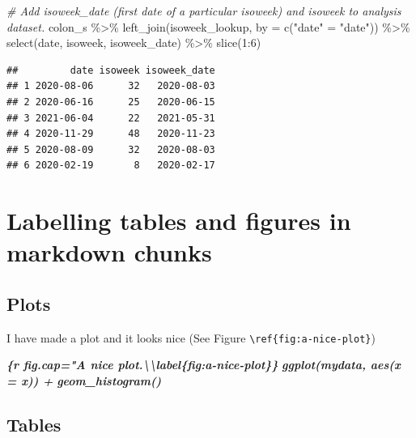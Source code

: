 \documentclass[
]{book}
\newenvironment{Shaded}{\begin{snugshade}}{\end{snugshade}}
\newcommand{\AttributeTok}[1]{\textcolor[rgb]{0.77,0.63,0.00}{#1}}
\newcommand{\CommentTok}[1]{\textcolor[rgb]{0.56,0.35,0.01}{\textit{#1}}}
\newcommand{\DecValTok}[1]{\textcolor[rgb]{0.00,0.00,0.81}{#1}}
\newcommand{\FunctionTok}[1]{\textcolor[rgb]{0.00,0.00,0.00}{#1}}
\newcommand{\InformationTok}[1]{\textcolor[rgb]{0.56,0.35,0.01}{\textbf{\textit{#1}}}}
\newcommand{\NormalTok}[1]{#1}
\newcommand{\OtherTok}[1]{\textcolor[rgb]{0.56,0.35,0.01}{#1}}
\newcommand{\SpecialCharTok}[1]{\textcolor[rgb]{0.00,0.00,0.00}{#1}}
\newcommand{\StringTok}[1]{\textcolor[rgb]{0.31,0.60,0.02}{#1}}
\begin{document}
\begin{Shaded}
\begin{Highlighting}[]
\CommentTok{\# Add isoweek\_date (first date of a particular isoweek) and isoweek to analysis dataset. }
\NormalTok{colon\_s }\SpecialCharTok{\%\textgreater{}\%} 
  \FunctionTok{left\_join}\NormalTok{(isoweek\_lookup, }\AttributeTok{by =} \FunctionTok{c}\NormalTok{(}\StringTok{"date"} \OtherTok{=} \StringTok{"date"}\NormalTok{)) }\SpecialCharTok{\%\textgreater{}\%} 
  \FunctionTok{select}\NormalTok{(date, isoweek, isoweek\_date) }\SpecialCharTok{\%\textgreater{}\%} 
  \FunctionTok{slice}\NormalTok{(}\DecValTok{1}\SpecialCharTok{:}\DecValTok{6}\NormalTok{)}
\end{Highlighting}
\end{Shaded}

\begin{verbatim}
##         date isoweek isoweek_date
## 1 2020-08-06      32   2020-08-03
## 2 2020-06-16      25   2020-06-15
## 3 2021-06-04      22   2021-05-31
## 4 2020-11-29      48   2020-11-23
## 5 2020-08-09      32   2020-08-03
## 6 2020-02-19       8   2020-02-17
\end{verbatim}

\hypertarget{labelling-tables-and-figures-in-markdown-chunks}{%
\section{Labelling tables and figures in markdown chunks}\label{labelling-tables-and-figures-in-markdown-chunks}}

\hypertarget{plots}{%
\subsection{Plots}\label{plots}}

I have made a plot and it looks nice (See Figure \texttt{\textbackslash{}ref\{fig:a-nice-plot\}})

\begin{Shaded}
\begin{Highlighting}[]
\InformationTok{\textasciigrave{}\textasciigrave{}\textasciigrave{}\{r fig.cap="A nice plot.\textbackslash{}\textbackslash{}label\{fig:a{-}nice{-}plot\}\}}
\InformationTok{ggplot(mydata, aes(x = x)) +}
\InformationTok{  geom\_histogram()}
\InformationTok{\textasciigrave{}\textasciigrave{}\textasciigrave{}}
\end{Highlighting}
\end{Shaded}

\hypertarget{tables}{%
\subsection{Tables}\label{tables}}
\end{document}
